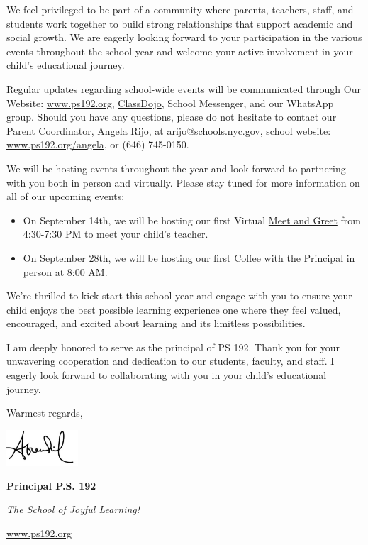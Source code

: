 \documentclass[12pt,letterpaper]{article}
\begin{document}
We feel privileged to be part of a community where parents, teachers, staff, and students
work together to build strong relationships that support academic and social growth. We
are eagerly looking forward to your participation in the various events throughout the
school year and welcome your active involvement in your child's educational journey.

Regular updates regarding school-wide events will be communicated through Our Website:
\url{www.ps192.org}, \href{https://www.classdojo.com/}{ClassDojo}, School Messenger, and our WhatsApp group. Should you
have any questions, please do not hesitate to contact our Parent Coordinator, Angela
Rijo, at \url{arijo@schools.nyc.gov}, school website: \url{www.ps192.org/angela}, or (646) 745-0150.
\pagebreak
\vspace*{1cm}

We will be hosting events throughout the year and look forward to partnering with you both
in person and virtually. Please stay tuned for more information on all of our upcoming
events:
	\begin{itemize}
	\item On September 14th, we will be hosting our first Virtual \href{https://www.ps192.org/apps/pages/index.jsp?uREC_ID=1504975&type=d&pREC_ID=2510452&tota11y=true}{Meet and Greet} from 4:30-7:30 PM to meet your child’s teacher.
	\item On September 28th, we will be hosting our first Coffee with the Principal in
	person at 8:00 AM.
	\end{itemize}
 
We're thrilled to kick-start this school year and engage with you to ensure your child
enjoys the best possible learning experience one where they feel valued, encouraged, and
excited about learning and its limitless possibilities.

I am deeply honored to serve as the principal of PS 192. Thank you for your unwavering
cooperation and dedication to our students, faculty, and staff. I eagerly look forward to
collaborating with you in your child's educational journey.

Warmest regards,

\includegraphics[width=0.2\textwidth]{hil_signature}

\textbf{Principal P.S. 192}

\textit{The School of Joyful Learning!}

\url{www.ps192.org}
\end{document}
